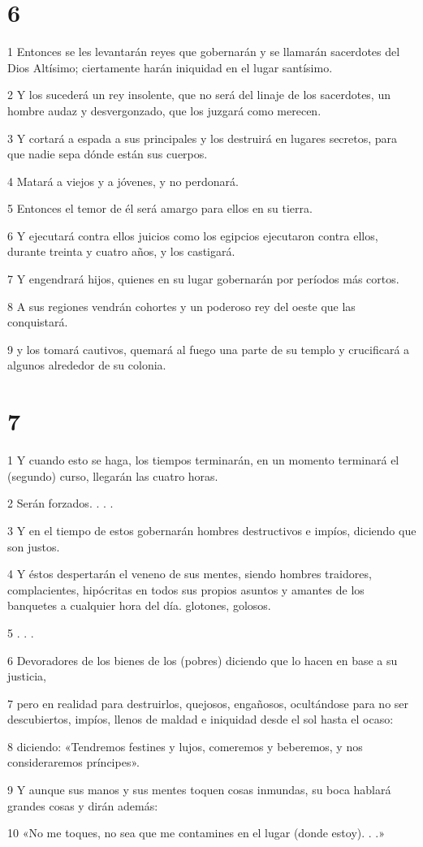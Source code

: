 \chapter{6}

\par 1 Entonces se les levantarán reyes que gobernarán y se llamarán sacerdotes del Dios Altísimo; ciertamente harán iniquidad en el lugar santísimo.
\par 2 Y los sucederá un rey insolente, que no será del linaje de los sacerdotes, un hombre audaz y desvergonzado, que los juzgará como merecen.
\par 3 Y cortará a espada a sus principales y los destruirá en lugares secretos, para que nadie sepa dónde están sus cuerpos.
\par 4 Matará a viejos y a jóvenes, y no perdonará.
\par 5 Entonces el temor de él será amargo para ellos en su tierra.
\par 6 Y ejecutará contra ellos juicios como los egipcios ejecutaron contra ellos, durante treinta y cuatro años, y los castigará.
\par 7 Y engendrará hijos, quienes en su lugar gobernarán por períodos más cortos.
\par 8 A sus regiones vendrán cohortes y un poderoso rey del oeste que las conquistará.
\par 9 y los tomará cautivos, quemará al fuego una parte de su templo y crucificará a algunos alrededor de su colonia.

\chapter{7}

\par 1 Y cuando esto se haga, los tiempos terminarán, en un momento terminará el (segundo) curso, llegarán las cuatro horas.
\par 2 Serán forzados. . . .
\par 3 Y en el tiempo de estos gobernarán hombres destructivos e impíos, diciendo que son justos.
\par 4 Y éstos despertarán el veneno de sus mentes, siendo hombres traidores, complacientes, hipócritas en todos sus propios asuntos y amantes de los banquetes a cualquier hora del día. glotones, golosos.
\par 5 . . .
\par 6 Devoradores de los bienes de los (pobres) diciendo que lo hacen en base a su justicia,
\par 7 pero en realidad para destruirlos, quejosos, engañosos, ocultándose para no ser descubiertos, impíos, llenos de maldad e iniquidad desde el sol hasta el ocaso:
\par 8 diciendo: «Tendremos festines y lujos, comeremos y beberemos, y nos consideraremos príncipes».
\par 9 Y aunque sus manos y sus mentes toquen cosas inmundas, su boca hablará grandes cosas y dirán además:
\par 10 «No me toques, no sea que me contamines en el lugar (donde estoy). . .»

